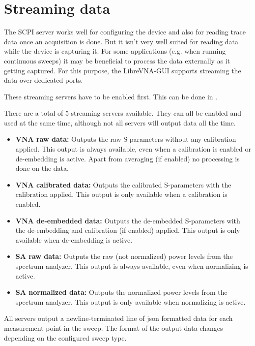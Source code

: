 \documentclass[a4paper,11pt]{article}
\begin{document}
\section{Streaming data}
The SCPI server works well for configuring the device and also for reading trace data once an acquisition is done. But it isn't very well suited for reading data while the device is capturing it. For some applications (e.g. when running continuous sweeps) it may be beneficial to process the data externally as it getting captured. For this purpose, the LibreVNA-GUI supports streaming the data over dedicated ports.

These streaming servers have to be enabled first. This can be done in .

There are a total of 5 streaming servers available. They can all be enabled and used at the same time, although not all servers will output data all the time.

\begin{itemize}
\item \textbf{VNA raw data:} Outputs the raw S-parameters without any calibration applied. This output is always available, even when a calibration is enabled or de-embedding is active. Apart from averaging (if enabled) no processing is done on the data.
\item \textbf{VNA calibrated data:} Outputs the calibrated S-parameters with the calibration applied. This output is only available when a calibration is enabled.
\item \textbf{VNA de-embedded data:} Outputs the de-embedded S-parameters with the de-embedding and calibration (if enabled) applied. This output is only available when de-embedding is active.
\item \textbf{SA raw data:} Outputs the raw (not normalized) power levels from the spectrum analyzer. This output is always available, even when normalizing is active.
\item \textbf{SA normalized data:} Outputs the normalized power levels from the spectrum analyzer. This output is only available when normalizing is active.
\end{itemize}

\vspace{0.5cm}

All servers output a newline-terminated line of json formatted data for each measurement point in the sweep. The format of the output data changes depending on the configured sweep type.
\end{document}

